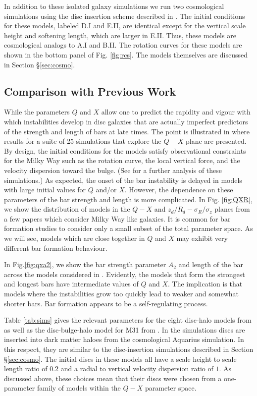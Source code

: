 In addition to these isolated galaxy simulations we run two
cosmological simulations using the disc insertion scheme described in
\citet{Bauer2018a}.  The initial conditions for these models, labeled
D.I and E.II, are identical except for the vertical scale height and
softening length, which are larger in E.II.  Thus, these models are
cosmological analogs to A.I and B.II.  The rotation curves for these
models are shown in the bottom panel of Fig. \ref{fig:rcs}.  The
models themselves are discussed in Section \S \ref{sec:cosmo}.

\subsection{Comparison with Previous Work}

While the parameters $Q$ and $X$ allow one to predict the rapidity and
vigour with which instabilities develop in disc galaxies that are
actually imperfect predictors of the strength and length of bars at
late times.  The point is illustrated in \citet{WPDGalactICSReference}
where results for a suite of 25 simulations that explore the $Q-X$
plane are presented.  By design, the initial conditions for the models
satisfy observational constraints for the Milky Way such as the
rotation curve, the local vertical force, and the velocity dispersion
toward the bulge.  (See \citet{hartmann2014} for a further analysis of
these simulations.)  As expected, the onset of the bar instability is
delayed in models with large initial values for $Q$ and/or $X$.
However, the dependence on these parameters of the bar strength and
length is more complicated.  {In Fig. \ref{fig:QXR}, we show the distribution
of models  in the $Q-X$ and $z_d/R_d-\sigma_R/\sigma_z$ planes from a few papers which
 consider Milky Way like galaxies.
It is common for bar formation studies to consider only a small subset
of the total parameter space. As we will see, models which are close together
in $Q$ and $X$ may exhibit very different bar formation behaviour.}

In Fig.\ref{fig:qxa2}, we show the bar
strength parameter $A_2$ and length of the bar { across the models considered
in \citet{WPDGalactICSReference}.}
Evidently, the models that form the strongest and longest bars have
intermediate values of $Q$ and $X$.  The implication is that models
where the instabilities grow too quickly lead to weaker and somewhat
shorter bars.  Bar formation appears to be a self-regulating process.

Table \ref{tab:sims} gives the relevant parameters for the eight
disc-halo models from \citet{YurinSpringelStellarDisks} as well as the
disc-bulge-halo model for M31 from \citet{gauthier2006}.  In the
\citet{YurinSpringelStellarDisks} simulations discs are inserted into
dark matter haloes from the cosmological Aquarius simulation.  In this
respect, they are similar to the disc-insertion simulations described
in Section \S \ref{sec:cosmo}.  The initial discs in these models all
have a scale height to scale length ratio of $0.2$ and a radial to
vertical velocity dispersion ratio of $1$.  As discussed above, these
choices mean that their discs were chosen from a one-parameter family
of models within the $Q-X$ parameter space.

